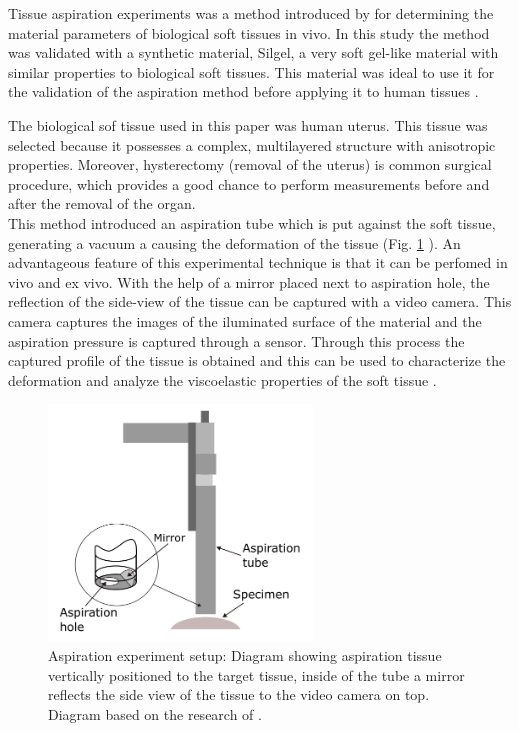 Tissue aspiration experiments was a method introduced by \citet{Kauer2002} for determining 
the material parameters of biological soft tissues in vivo.
In this study the method was validated with a synthetic material, Silgel, a very 
soft gel-like material with similar properties to biological soft tissues. 
This material was ideal to use it for the validation of the 
aspiration method before applying it to human tissues \cite{Kauer2002}.

The biological sof tissue used in this paper was human uterus. This tissue was selected 
because it possesses a complex, multilayered structure with anisotropic properties. 
Moreover, hysterectomy (removal of the uterus) is common surgical procedure, which 
provides a good chance to perform measurements before and after the removal of the organ.\\

This method introduced an aspiration tube which is put against the 
soft tissue, generating a vacuum a causing the deformation of the tissue (Fig. \ref{fig:aspiration} ). 
An advantageous feature of this experimental technique is that 
it can be perfomed in vivo and ex vivo.
With the help of a mirror placed next to aspiration hole, the reflection 
of the side-view of the tissue can be captured with a video camera.
This camera captures the images of the iluminated surface of the material and the 
aspiration pressure is captured through a sensor. Through this process the captured 
profile of the tissue is obtained and this can be used to characterize the deformation 
and analyze the viscoelastic properties of the soft tissue \cite{Kauer2002}.

\begin{figure}[th]
        \centering
        \includegraphics[width=7cm]{Images/chapter1/aspirationkauer.png}
        \caption[Aspiration experiment by \citet{Kauer2002}]{Aspiration experiment setup: Diagram showing aspiration tissue vertically positioned to the target tissue, inside of the tube a mirror reflects the side view of the tissue to the video camera on top. Diagram based on the research of \citet{Kauer2002}.}
        \label{fig:aspiration}
\end{figure}

